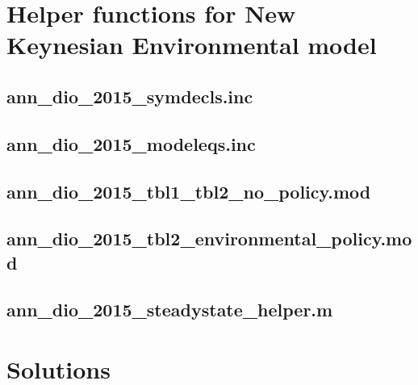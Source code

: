 \section{Helper functions for New Keynesian Environmental model}

\subsection{ann\_dio\_2015\_symdecls.inc\label{app:ann_dio_2015_symdecls}}


\subsection{ann\_dio\_2015\_modeleqs.inc\label{app:ann_dio_2015_modeleqs}}


\subsection{ann\_dio\_2015\_tbl1\_tbl2\_no\_policy.mod\label{app:ann_dio_2015_tbl1_tbl2_no_policy}}


\subsection{ann\_dio\_2015\_tbl2\_environmental\_policy.mod\label{app:ann_dio_2015_tbl2_environmental_policy}}


\subsection{ann\_dio\_2015\_steadystate\_helper.m\label{app:ann_dio_2015_steadystate_helper}}


\ifDisplaySolutions%
\newpage
\appendix
\section{Solutions}

\fi
